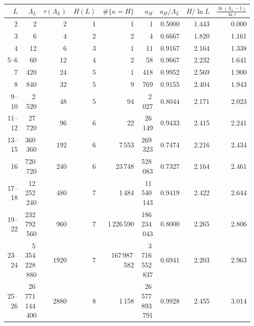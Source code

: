 \begin{tabular}{rrrrrrrrr}
\toprule
$L$ & $\Lambda_L$ & $\tau(\Lambda_L)$ & $H(L)$ & $\#\{\kappa=H\}$ & $a_H$ & $a_H/\Lambda_L$ & $H/\ln L$ & $\frac{\ln(\Lambda_L-1)}{\ln\tau}$\\
\midrule
2 & 2 & 2 & 1 & 1 & 1 & 0.5000 & 1.443 & 0.000\\
3 & 6 & 4 & 2 & 2 & 4 & 0.6667 & 1.820 & 1.161\\
4 & 12 & 6 & 3 & 1 & 11 & 0.9167 & 2.164 & 1.338\\
5--6 & 60 & 12 & 4 & 2 & 58 & 0.9667 & 2.232 & 1.641\\
7 & 420 & 24 & 5 & 1 & 418 & 0.9952 & 2.569 & 1.900\\
8 & 840 & 32 & 5 & 9 & 769 & 0.9155 & 2.404 & 1.943\\
9--10 & 2\,520 & 48 & 5 & 94 & 2\,027 & 0.8044 & 2.171 & 2.023\\
11--12 & 27\,720 & 96 & 6 & 22 & 26\,149 & 0.9433 & 2.415 & 2.241\\
13--15 & 360\,360 & 192 & 6 & 7\,553 & 269\,323 & 0.7474 & 2.216 & 2.434\\
16 & 720\,720 & 240 & 6 & 23\,748 & 528\,083 & 0.7327 & 2.164 & 2.461\\
17--18 & 12\,252\,240 & 480 & 7 & 1\,484 & 11\,540\,143 & 0.9419 & 2.422 & 2.644\\
19--22 & 232\,792\,560 & 960 & 7 & 1\,226\,590 & 186\,234\,043 & 0.8000 & 2.265 & 2.806\\
23--24 & 5\,354\,228\,880 & 1920 & 7 & 167\,987\,582 & 3\,716\,552\,837 & 0.6941 & 2.203 & 2.963\\
25--26 & 26\,771\,144\,400 & 2880 & 8 & 1\,158 & 26\,577\,893\,791 & 0.9928 & 2.455 & 3.014\\
\bottomrule
\end{tabular}